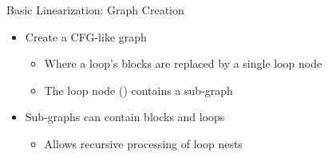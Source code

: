 \begin{frame}{Basic Linearization: Graph Creation}

\begin{itemize}
    \item Create a CFG-like graph
    \begin{itemize}
        \item Where a loop's blocks are replaced by a single loop node
        \item The loop node () contains a sub-graph
    \end{itemize}
    \item Sub-graphs can contain blocks and loops
    \begin{itemize}
        \item Allows recursive processing of loop nests
    \end{itemize}
\end{itemize}


\end{frame}


